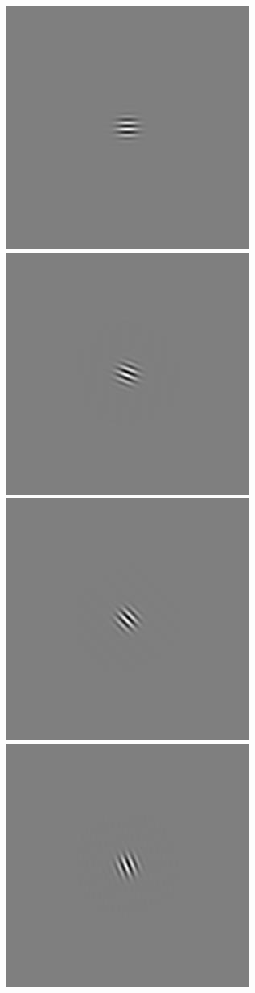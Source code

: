 \begin{figure}
\begin{center}
 \includegraphics[scale=0.1]{ch4/figures/rGabor1_4.jpg}
 \includegraphics[scale=0.1]{ch4/figures/rGabor1_5.jpg}
 \includegraphics[scale=0.1]{ch4/figures/rGabor1_6.jpg}
 \includegraphics[scale=0.1]{ch4/figures/rGabor1_7.jpg}\\

\end{center}
\end{figure}
